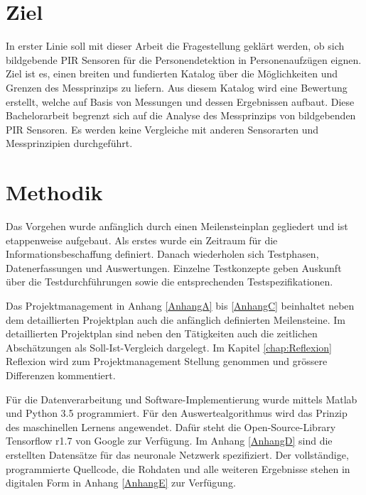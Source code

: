 \section{Ziel}
\label{sec:Einleitung}
In erster Linie soll mit dieser Arbeit die Fragestellung geklärt werden, ob sich bildgebende \ac{PIR} Sensoren für die Personendetektion in Personenaufzügen eignen. Ziel ist es, einen breiten und fundierten Katalog über die Möglichkeiten und Grenzen des Messprinzips zu liefern. Aus diesem Katalog wird eine Bewertung erstellt, welche auf Basis von Messungen und dessen Ergebnissen aufbaut. Diese Bachelorarbeit begrenzt sich auf die Analyse des Messprinzips von bildgebenden \ac{PIR} Sensoren. Es werden keine Vergleiche mit anderen Sensorarten und Messprinzipien durchgeführt.

\section {Methodik}
\label{sec:Methodik}
Das Vorgehen wurde anfänglich durch einen Meilensteinplan gegliedert und ist etappenweise aufgebaut. Als erstes wurde ein Zeitraum für die Informationsbeschaffung definiert. Danach wiederholen sich Testphasen, Datenerfassungen und Auswertungen. Einzelne Testkonzepte geben Auskunft über die Testdurchführungen sowie die entsprechenden Testspezifikationen. 

Das Projektmanagement in Anhang \ref{AnhangA} bis \ref{AnhangC} beinhaltet neben dem detaillierten Projektplan auch die anfänglich definierten Meilensteine. Im detaillierten Projektplan sind neben den Tätigkeiten auch die zeitlichen Abschätzungen als Soll-Ist-Vergleich dargelegt. Im Kapitel \ref{chap:Reflexion} Reflexion wird zum Projektmanagement Stellung genommen und grössere Differenzen kommentiert.

Für die Datenverarbeitung und Software-Implementierung wurde mittels Matlab und Python 3.5 programmiert. Für den Auswertealgorithmus wird das Prinzip des maschinellen Lernens angewendet. Dafür steht die Open-Source-Library Tensorflow r1.7 von Google zur Verfügung. Im Anhang \ref{AnhangD} sind die erstellten Datensätze für das neuronale Netzwerk spezifiziert. Der vollständige, programmierte Quellcode, die Rohdaten und alle weiteren Ergebnisse stehen in digitalen Form in  Anhang \ref{AnhangE} zur Verfügung. 


